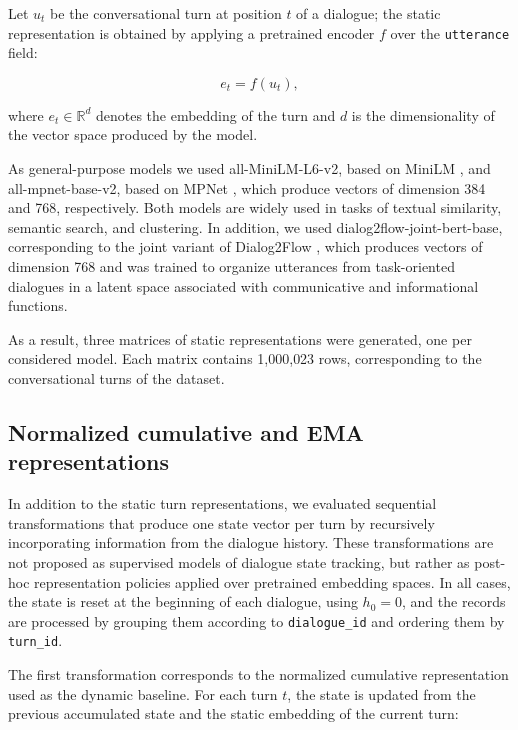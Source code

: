 \documentclass[runningheads]{llncs}
\begin{document}
Let $u_t$ be the conversational turn at position $t$ of a dialogue; the static representation is obtained by applying a pretrained encoder $f$ over the \texttt{utterance} field:

\begin{equation}
    e_t = f(u_t),
\end{equation}

\noindent where $e_t \in \mathbb{R}^d$ denotes the embedding of the turn and $d$ is the dimensionality of the vector space produced by the model.

As general-purpose models we used all-MiniLM-L6-v2, based on MiniLM \cite{wang2020minilm}, and all-mpnet-base-v2, based on MPNet \cite{song2020mpnet}, which produce vectors of dimension 384 and 768, respectively. Both models are widely used in tasks of textual similarity, semantic search, and clustering. In addition, we used dialog2flow-joint-bert-base, corresponding to the joint variant of Dialog2Flow \cite{burdisso2024dialog2flow}, which produces vectors of dimension 768 and was trained to organize utterances from task-oriented dialogues in a latent space associated with communicative and informational functions.

As a result, three matrices of static representations were generated, one per considered model. Each matrix contains 1{,}000{,}023 rows, corresponding to the conversational turns of the dataset.

\subsection{Normalized cumulative and EMA representations}

In addition to the static turn representations, we evaluated sequential transformations that produce one state vector per turn by recursively incorporating information from the dialogue history. These transformations are not proposed as supervised models of dialogue state tracking, but rather as post-hoc representation policies applied over pretrained embedding spaces. In all cases, the state is reset at the beginning of each dialogue, using $h_0 = 0$, and the records are processed by grouping them according to \texttt{dialogue\_id} and ordering them by \texttt{turn\_id}.

The first transformation corresponds to the normalized cumulative representation used as the dynamic baseline. For each turn $t$, the state is updated from the previous accumulated state and the static embedding of the current turn:
\end{document}
